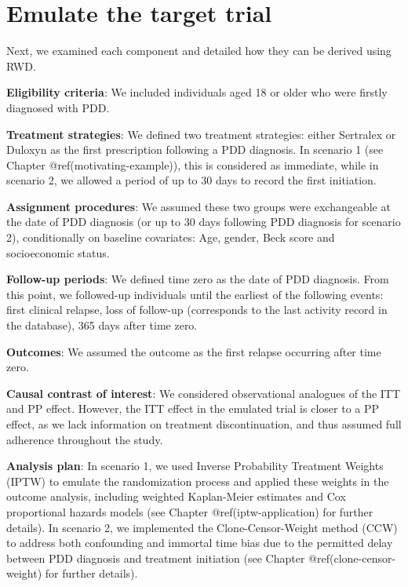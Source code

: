 \documentclass[
]{book}
\begin{document}
\section{Emulate the target trial}\label{emulate-the-target-trial}

Next, we examined each component and detailed how they can be derived
using RWD.

\textbf{Eligibility criteria}: We included individuals aged 18 or older
who were firstly diagnosed with PDD.

\textbf{Treatment strategies}: We defined two treatment strategies:
either Sertralex or Duloxyn as the first prescription following a PDD
diagnosis. In scenario 1 (see Chapter @ref(motivating-example)), this is
considered as immediate, while in scenario 2, we allowed a period of up
to 30 days to record the first initiation.

\textbf{Assignment procedures}: We assumed these two groups were
exchangeable at the date of PDD diagnosis (or up to 30 days following
PDD diagnosis for scenario 2), conditionally on baseline covariates:
Age, gender, Beck score and socioeconomic status.

\textbf{Follow-up periods}: We defined time zero as the date of PDD
diagnosis. From this point, we followed-up individuals until the
earliest of the following events: first clinical relapse, loss of
follow-up (corresponds to the last activity record in the database), 365
days after time zero.

\textbf{Outcomes}: We assumed the outcome as the first relapse occurring
after time zero.

\textbf{Causal contrast of interest}: We considered observational
analogues of the ITT and PP effect. However, the ITT effect in the
emulated trial is closer to a PP effect, as we lack information on
treatment discontinuation, and thus assumed full adherence throughout
the study.

\textbf{Analysis plan}: In scenario 1, we used Inverse Probability
Treatment Weights (IPTW) to emulate the randomization process and
applied these weights in the outcome analysis, including weighted
Kaplan-Meier estimates and Cox proportional hazards models (see Chapter
@ref(iptw-application) for further details). In scenario 2, we
implemented the Clone-Censor-Weight method (CCW) to address both
confounding and immortal time bias due to the permitted delay between
PDD diagnosis and treatment initiation (see Chapter
@ref(clone-censor-weight) for further details).
\end{document}
